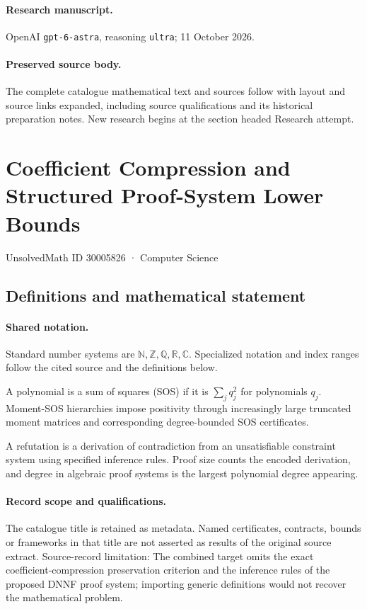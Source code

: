 \documentclass[11pt]{article}
\begin{document}
\paragraph{Research manuscript.} OpenAI \texttt{gpt-6-astra}, reasoning \texttt{ultra}; 11 October 2026.
\paragraph{Preserved source body.} The complete catalogue mathematical text and sources follow with layout and source links expanded, including source qualifications and its historical preparation notes. New research begins at the section headed Research attempt.

\section{Coefficient Compression and Structured Proof-System Lower Bounds}\label{30005826}
{\small UnsolvedMath ID 30005826 · Computer Science}
\subsection{Definitions and mathematical statement}

\paragraph{Shared notation.}Standard number systems are $\mathbb N,\mathbb Z,\mathbb Q,\mathbb R,\mathbb C$. Specialized notation and index ranges follow the cited source and the definitions below.


A polynomial is a sum of squares (SOS) if it is $\sum_j q_j^2$ for polynomials $q_j$. Moment-SOS hierarchies impose positivity through increasingly large truncated moment matrices and corresponding degree-bounded SOS certificates.

A refutation is a derivation of contradiction from an unsatisfiable constraint system using specified inference rules. Proof size counts the encoded derivation, and degree in algebraic proof systems is the largest polynomial degree appearing.
\paragraph{Record scope and qualifications.}
The catalogue title is retained as metadata. Named certificates, contracts, bounds or frameworks in that title are not asserted as results of the original source extract.
Source-record limitation: The combined target omits the exact coefficient-compression preservation criterion and the inference rules of the proposed DNNF proof system; importing generic definitions would not recover the mathematical problem.
\end{document}
